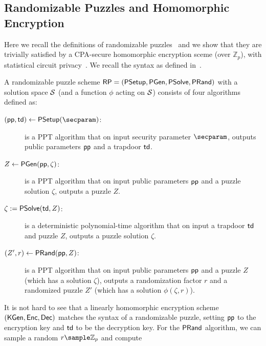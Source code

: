 \subsection{Randomizable Puzzles and Homomorphic Encryption}
\label{sec:randpuzzle}

Here we recall the definitions of randomizable puzzles~\cite{SP:TaiMorMaf21} and we show that they are trivially satisfied by a CPA-secure homomorphic encryption sceme (over $\mathbb{Z}_p$), with statistical circuit privacy~\cite{C:OstPasPas14}. We recall the syntax as defined in~\cite{SP:TaiMorMaf21}.

\begin{definition}
A randomizable puzzle scheme $\mathsf{RP} = (\mathsf{PSetup}, \mathsf{PGen}, \mathsf{PSolve}, \mathsf{PRand})$ with a solution space $\mathcal{S}$ (and a function $\phi$ acting on $\mathcal{S}$) consists of four algorithms defined as:
\begin{description}
	\item[$(\pparam, \td) \gets \psetup(\secparam)$:] is a PPT algorithm that on input security parameter $\secparam$, outputs public parameters $\mathsf{pp}$ and a trapdoor $\mathsf{td}$.
	\item[$Z \gets \mathsf{PGen}(\mathsf{pp}, \zeta)$:] is a PPT algorithm that on input public parameters $\mathsf{pp}$ and a puzzle solution $\zeta$, outputs a puzzle $Z$.
	\item[$\zeta := \mathsf{PSolve}(\mathsf{td}, Z)$:] is a deterministic polynomial-time algorithm that on input a trapdoor $\mathsf{td}$ and puzzle $Z$, outputs a puzzle solution $\zeta$.
	\item[$(Z', r) \gets \mathsf{PRand}(\mathsf{pp}, Z)$:] is a PPT algorithm that on input public parameters $\mathsf{pp}$ and a puzzle $Z$ (which has a solution $\zeta$), outputs a randomization factor $r$ and a randomized puzzle $Z'$ (which has a solution $\phi(\zeta, r)$).
\end{description}
\end{definition}
It is not hard to see that a linearly homomorphic encryption scheme $({\mathsf{KGen}},\allowbreak {\mathsf{Enc}}, {\mathsf{Dec}})$ matches the syntax of a randomizable puzzle, setting $\mathsf{pp}$ to the encryption key and $\mathsf{td}$ to be the decryption key. For the $\mathsf{PRand}$ algorithm, we can sample a random $r \sample \mathbb{Z}_p$ and compute
